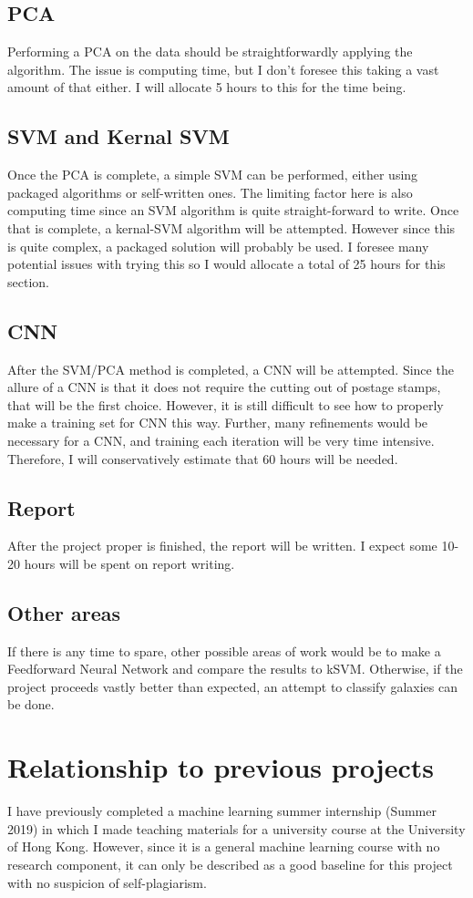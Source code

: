 \documentclass[a4paper,11pt]{article}
\begin{document}
\subsection{PCA}
Performing a PCA on the data should be straightforwardly applying the algorithm. The issue is computing time, but I don't foresee this taking a vast amount of that either. I will allocate 5 hours to this for the time being.
\subsection{SVM and Kernal SVM}
Once the PCA is complete, a simple SVM can be performed, either using packaged algorithms or self-written ones. The limiting factor here is also computing time since an SVM algorithm is quite straight-forward to write.
Once that is complete, a kernal-SVM algorithm will be attempted. However since this is quite complex, a packaged solution will probably be used. I foresee many potential issues with trying this so I would allocate a total of 25 hours for this section.
\subsection{CNN}
After the SVM/PCA method is completed, a CNN will be attempted. Since the allure of a CNN is that it does not require the cutting out of postage stamps, that will be the first choice. However, it is still difficult to see how to properly make a training set for CNN this way. Further, many refinements would be necessary for a CNN, and training each iteration will be very time intensive. Therefore, I will conservatively estimate that 60 hours will be needed.
\subsection{Report}
After the project proper is finished, the report will be written. I expect some 10-20 hours will be spent on report writing.
\subsection{Other areas}
If there is any time to spare, other possible areas of work would be to make a Feedforward Neural Network and compare the results to kSVM. Otherwise, if the project proceeds vastly better than expected, an attempt to classify galaxies can be done.

\section{Relationship to previous projects}
I have previously completed a machine learning summer internship (Summer 2019) in which I made teaching materials for a university course at the University of Hong Kong. However, since it is a general machine learning course with no research component, it can only be described as a good baseline for this project with no suspicion of self-plagiarism.
\end{document}
